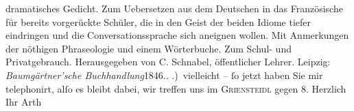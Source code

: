\begin{ledgroupsized}[t]{13cm}
{{{{                     dramatisches Gedicht. Zum Uebersetzen aus dem Deutschen in das Französische für
                     bereits vorgerückte Schüler, die in den Geist der beiden Idiome tiefer
                     eindringen und die Conversationssprache sich aneignen wollen. Mit Anmerkungen
                     der nöthigen Phraseologie und einem Wörterbuche. Zum Schul- und Privatgebrauch}.
                     Herausgegeben von C. Schnabel, öffentlicher
                     Lehrer. Leipzig: \emph{Baumgärtner’sche Buchhandlung}1846.}}}\label{K_L00425_2h}.\pend
           .) vielleicht – ſo jetzt haben Sie mir telephonirt, alſo es bleibt dabei, {\pb}wir treffen uns im \textsc{Griensteidl} gegen 8. Herzlich\pend
           \pstart Ihr \spacefill\mbox{Arth}\pend{}
         
         \endnumbering{}\end{ledgroupsized}  \newcommand{\dateiname}{L00425}\newcommand{\titel}{Arthur Schnitzler an Richard Beer-Hofmann, [26. 3. 1895]}\newcommand{\editorInnen}{ Martin Anton Müller und Gerd-Hermann Susen}
      